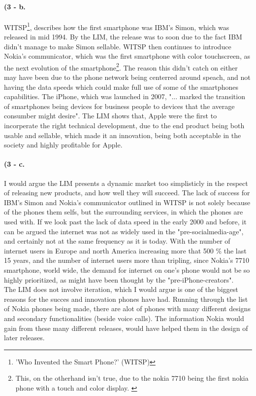 \documentclass[paper=a4, fontsize=12pt]{scrartcl} %
\numberwithin{equation}{section} %
\numberwithin{figure}{section} %
\numberwithin{table}{section} %
\begin{document}
	\paragraph{(3 - b.}
	
	WITSP\footnote{'Who Invented the Smart Phone?' (WITSP)}, describes how the first smartphone was IBM's Simon\cite{OMI1}, which was released in mid 1994\cite{WIKIIBM}. By the LIM, the release was to soon due to the fact IBM didn't manage to make Simon sellable. WITSP then continues to introduce Nokia’s communicator, which was the first smartphone with color touchscreen, as the next evolution of the smartphone\cite{OMI2}\footnote{This, on the otherhand isn't true, due to the nokia 7710 being the first nokia phone with a touch and color display. \cite{NOKIA1}\cite{NOKIA2}\cite{NOKIA3}}. The reason this didn't catch on either may have been due to the phone network being centerred around speach, and not having the data speeds which could make full use of some of the smartphones capabilities\cite{OMI1}\cite{NYT1}. The iPhone, which was launched in 2007, "... marked the transition of smartphones being devices for business people to devices that the average consumber might desire"\cite{OMI3}. The LIM shows that, Apple were the first to incorperate the right technical development, due to the end product being both usable and sellable, which made it an innovation, being both acceptable in the society and highly profitable for Apple.
	
	\paragraph{(3 - c.}
	
	I would argue the LIM presents a dynamic market too simplisticly in the respect of releasing new products, and how well they will succeed. The lack of success for IBM's Simon and Nokia's communicator outlined in WITSP\cite{OMI1}\cite{OMI2} is not solely because of the phones them selfs, but the surrounding services, in which the phones are used with. If we look past the lack of data speed in the early 2000 and before\cite{NYT1}, it can be argued the internet was not as widely used in the "pre-socialmedia-age", and certainly not at the same frequency as it is today. With the number of internet users in Europe and north America increasing more that 500 \% the last 15 years\cite{IWS}, and the number of internet users more than tripling, since Nokia's 7710 smartphone, world wide\cite{ILS}, the demand for internet on one's phone would not be so highly prioritized, as might have been thought by the "pre-iPhone-creators". \\
	The LIM does not involve iteration, which I would argue is one of the biggest reasons for the succes and innovation phones have had. Running through the list of Nokia phones being made, there are alot of phones with many different designs and secondary functionalities (beside voice calls)\cite{NOKIA1}. The information Nokia would gain from these many different releases, would have helped them in the design of later releases.
	
\end{document}
